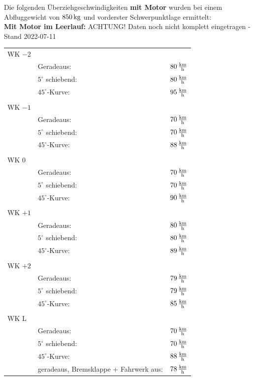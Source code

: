 Die folgenden Überziehgeschwindigkeiten \textbf{mit Motor} wurden bei einem Abfluggewicht von $\unit[850]{kg}$ und vorderster Schwerpunktlage ermittelt:\\

\textbf{Mit Motor im Leerlauf:}
ACHTUNG! Daten noch nicht komplett eingetragen - Stand 2022-07-11
\begin{longtable}{l l l}
WK $-2$ & & \\
& Geradeaus: & $\unit[80]{\frac{km}{h}}$\\
& $5^{\circ}$ schiebend: & $\unit[80]{\frac{km}{h}}$\\
& $45^{\circ}$-Kurve: & $\unit[95]{\frac{km}{h}}$\\
\hline
& &  \\
WK $-1$ & & \\
& Geradeaus: & $\unit[70]{\frac{km}{h}}$\\
& $5^{\circ}$ schiebend: & $\unit[70]{\frac{km}{h}}$\\
& $45^{\circ}$-Kurve: & $\unit[88]{\frac{km}{h}}$\\
\hline
& &  \\
WK $0$ & & \\
& Geradeaus: & $\unit[70]{\frac{km}{h}}$\\
& $5^{\circ}$ schiebend: & $\unit[70]{\frac{km}{h}}$\\
& $45^{\circ}$-Kurve: & $\unit[90]{\frac{km}{h}}$\\
\hline
& &  \\
WK $+1$ & & \\
& Geradeaus: & $\unit[80]{\frac{km}{h}}$\\
& $5^{\circ}$ schiebend: & $\unit[80]{\frac{km}{h}}$\\
& $45^{\circ}$-Kurve: & $\unit[89]{\frac{km}{h}}$\\
\hline
 & & \\
WK $+2$ & & \\
& Geradeaus: & $\unit[79]{\frac{km}{h}}$\\
& $5^{\circ}$ schiebend: & $\unit[79]{\frac{km}{h}}$\\
& $45^{\circ}$-Kurve: & $\unit[85]{\frac{km}{h}}$\\
\hline
& &  \\
WK L& & \\
& Geradeaus: & $\unit[70]{\frac{km}{h}}$\\
& $5^{\circ}$ schiebend: & $\unit[70]{\frac{km}{h}}$\\
& $45^{\circ}$-Kurve: & $\unit[88]{\frac{km}{h}}$\\
& geradeaus, Bremsklappe + Fahrwerk aus: & $\unit[78]{\frac{km}{h}}$ \\
\end{longtable}



